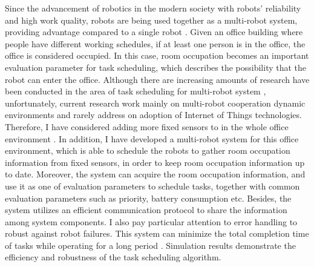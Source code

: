 Since the advancement of robotics in the modern society with robots' reliability and high work quality, robots are being used together as a multi-robot system, providing advantage compared to a single robot \cite{Eijyne2020DevelopmentOA}. 
Given an office building where people have different working schedules, if at least one person is in the office, the office is considered occupied.
In this case, room occupation becomes an important evaluation parameter for task scheduling, which describes the possibility that the robot can enter the office.
Although there are increasing amounts of research have been conducted in the area of task scheduling for multi-robot system \cite{Shah7}, unfortunately, current research work mainly on multi-robot cooperation dynamic environments and rarely address on adoption of Internet of Things technologies. 
Therefore, I have considered adding more fixed sensors to in the whole office environment \cite{Coltin10}. 
In addition, I have developed a multi-robot system for this office environment, which is able to schedule the robots to gather room occupation information from fixed sensors, in order to keep room occupation information up to date.
Moreover, the system can acquire the room occupation information, and use it as one of evaluation parameters to schedule tasks, together with common evaluation parameters such as priority, battery consumption etc. 
Besides, the system utilizes an efficient communication protocol to share the information among system components.
I also pay particular attention to error handling to robust against robot failures. This system can minimize the total completion time of tasks while operating for a long period \cite{Chun12}. Simulation results demonstrate the efficiency and robustness of the task scheduling algorithm.

\cleardoublepage

